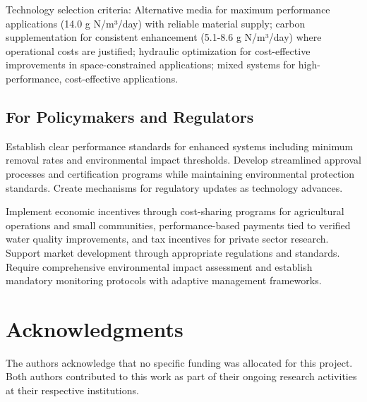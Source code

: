 \documentclass[12pt,a4paper]{article}
\begin{document}
Technology selection criteria: Alternative media for maximum performance applications (14.0 g N/m³/day) with reliable material supply; carbon supplementation for consistent enhancement (5.1-8.6 g N/m³/day) where operational costs are justified; hydraulic optimization for cost-effective improvements in space-constrained applications; mixed systems for high-performance, cost-effective applications.

\subsection{For Policymakers and Regulators}

Establish clear performance standards for enhanced systems including minimum removal rates and environmental impact thresholds. Develop streamlined approval processes and certification programs while maintaining environmental protection standards. Create mechanisms for regulatory updates as technology advances.

Implement economic incentives through cost-sharing programs for agricultural operations and small communities, performance-based payments tied to verified water quality improvements, and tax incentives for private sector research. Support market development through appropriate regulations and standards. Require comprehensive environmental impact assessment and establish mandatory monitoring protocols with adaptive management frameworks.

\section{Acknowledgments}

The authors acknowledge that no specific funding was allocated for this project. Both authors contributed to this work as part of their ongoing research activities at their respective institutions.



\end{document}
